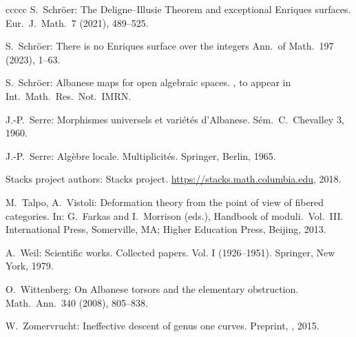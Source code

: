 \documentclass[oneside, 12pt]{amsart}
\theoremstyle{definition}
\theoremstyle{remark}
\begin{document}
\begin{thebibliography}{ccccc}
S.\ Schr\"oer:
The Deligne--Illusie Theorem and exceptional Enriques surfaces.
Eur.\ J.\ Math.\  7 (2021),  489--525.

S.\ Schr\"oer:
There is no Enriques surface over the integers
Ann.\ of Math.\ 197 (2023), 1--63.

S.\ Schr\"oer:
Albanese maps for open algebraic spaces.
,  to appear in Int.\ Math.\ Res.\ Not.\ IMRN.

J.-P.\ Serre:
Morphismes universels et vari\'et\'es d'Albanese. 
S\'em.\ C.\ Chevalley 3, 1960. 

J.-P.\ Serre:
Alg\`ebre locale. Multiplicit\'es. 
Springer, Berlin, 1965.

Stacks project authors: Stacks project.
\url{https://stacks.math.columbia.edu}, 2018.

M.\ Talpo, A.\ Vistoli:
Deformation theory from the point of view of fibered categories.
In: 
G.\ Farkas and I.\ Morrison (eds.), Handbook of moduli.\ Vol.\ III.
International Press, Somerville, MA; Higher Education Press, Beijing, 2013. 

A.\ Weil:
Scientific works. Collected papers. Vol. I (1926--1951). 
Springer, New York, 1979.

O.\ Wittenberg:
On Albanese torsors and the elementary obstruction. 
Math.\ Ann.\ 340 (2008), 805--838. 

W.\ Zomervrucht:
Ineffective descent of genus one curves.
Preprint, , 2015.  
\end{thebibliography}
\end{document}
